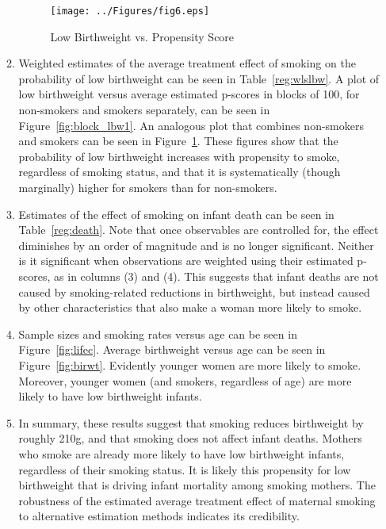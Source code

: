 \documentclass{article}
\begin{document}
\begin{enumerate}
\begin{enumerate}
\begin{figure}[htbp!]
\centering
\texttt{[image: ../Figures/fig6.eps]}
\caption{Low Birthweight vs. Propensity Score}
\label{fig:block_lbw2}
\end{figure}

\item Weighted estimates of the average treatment effect of smoking on the probability of low birthweight can be seen in Table~\ref{reg:wlslbw}. A plot of low birthweight versus average estimated p-scores in blocks of 100, for non-smokers and smokers separately, can be seen in Figure~\ref{fig:block_lbw1}. An analogous plot that combines non-smokers and smokers can be seen in Figure~\ref{fig:block_lbw2}. These figures show that the probability of low birthweight increases with propensity to smoke, regardless of smoking status, and that it is systematically (though marginally) higher for smokers than for non-smokers.



\item Estimates of the effect of smoking on infant death can be seen in Table~\ref{reg:death}. Note that once observables are controlled for, the effect diminishes by an order of magnitude and is no longer significant. Neither is it significant when observations are weighted using their estimated p-scores, as in columns (3) and (4). This suggests that infant deaths are not caused by smoking-related reductions in birthweight, but instead caused by other characteristics that also make a woman more likely to smoke.



\item Sample sizes and smoking rates versus age can be seen in Figure~\ref{fig:lifec}. Average birthweight versus age can be seen in Figure~\ref{fig:birwt}. Evidently younger women are more likely to smoke. Moreover, younger women (and smokers, regardless of age) are more likely to have low birthweight infants.

\item In summary, these results suggest that smoking reduces birthweight by roughly 210g, and that smoking does not affect infant deaths. Mothers who smoke are already more likely to have low birthweight infants, regardless of their smoking status. It is likely this propensity for low birthweight that is driving infant mortality among smoking mothers. The robustness of the estimated average treatment effect of maternal smoking to alternative estimation methods indicates its credibility. 


\end{enumerate}
\end{enumerate}
\end{document}
